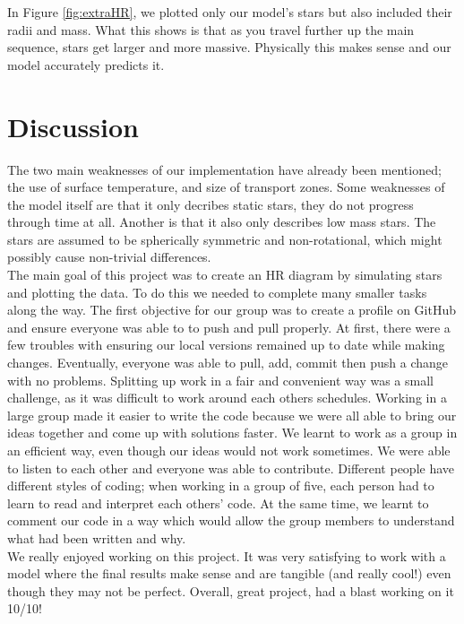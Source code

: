 \documentclass[10pt]{article}
\begin{document}
In Figure \ref{fig:extraHR}, we plotted only our model's stars but also included their radii and mass. What this shows is that as you travel further up the main sequence, stars get larger and more massive. Physically this makes sense and our model accurately predicts it.

\section{Discussion}
The two main weaknesses of our implementation have already been mentioned; the use of surface temperature, and size of transport zones. Some weaknesses of the model itself are that it only decribes static stars, they do not progress through time at all. Another is that it also only describes low mass stars. The stars are assumed to be spherically symmetric and non-rotational, which might possibly cause non-trivial differences.  \\
The main goal of this project was to create an HR diagram by simulating stars and plotting the data. To do this we needed to complete many smaller tasks along the way. The first objective for our group was to create a profile on GitHub and ensure everyone was able to to push and pull properly. At first, there were a few troubles with  ensuring our local versions remained up to date while making changes. Eventually, everyone was able to pull, add, commit then push a change with no problems. Splitting up work in a fair and convenient way was a small challenge, as it was difficult to work around each others schedules. Working in a large group made it easier to write the code because we were all able to bring our ideas together and come up with solutions faster. We learnt to work as a group in an efficient way, even though our ideas would not work sometimes. We were able to listen to each other and everyone was able to contribute. Different people have different styles of coding; when working in a group of five, each person had to learn to read and interpret each others' code. At the same time, we learnt to comment our code in a way which would allow the group members to understand what had been written and why. \\

We really enjoyed working on this project. It was very satisfying to work with a model where the final results make sense and are tangible (and really cool!) even though they may not be perfect. Overall, great project, had a blast working on it 10/10!\\
\end{document}
